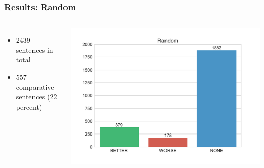 \documentclass[11pt,aspectratio=169,usenames,dvipsnames]{beamer}
\begin{document}
    \begin{frame}[t]
        \frametitle{Results: Random}
        \begin{columns}
            \column{2in}
            \begin{itemize}
                \item 2439 sentences in total
                \item 557 comparative sentences (22 percent)
            \end{itemize}
            \column{3in}
            \includegraphics[scale=0.45,trim={1cm 0 2cm 1cm},clip]{images/Random-dist.pdf}
        \end{columns}
    \end{frame}
\end{document}
